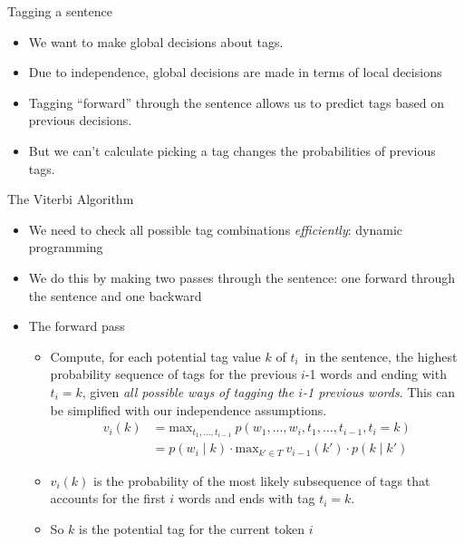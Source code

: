 \documentclass[11pt,letterpaper]{article}
\newcommand{\tcurr}{\ensuremath{t_i}}
\begin{document}
Tagging a sentence

\begin{itemize}
  \item We want to make global decisions about tags.
  \item Due to independence, global decisions are made in terms of local decisions
  \item Tagging ``forward'' through the sentence allows us to predict tags based on previous decisions.
  \item But we can't calculate picking a tag changes the probabilities of previous tags.
\end{itemize}

The Viterbi Algorithm

\begin{itemize}
  \item We need to check all possible tag combinations \textit{efficiently}: dynamic programming
  \item We do this by making two passes through the sentence: one forward through the sentence and one backward
  \item The forward pass
    \begin{itemize}
      \item Compute, for each potential tag value $k$ of \tcurr\ in the sentence, the highest probability sequence of tags for the previous $i$-1 words and ending with $t_i=k$, given \textit{all possible ways of tagging the $i$-1 previous words}.  This can be simplified with our independence assumptions.
        \begin{align*}
          v_i(k) &= \text{max}_{t_1, ..., t_{i-1}}~p(w_1, ..., w_i, t_1, ..., t_{i-1}, t_i=k) \\
                 &= p(w_i \mid k) \cdot \text{max}_{k' \in T}~v_{i-1}(k') \cdot p(k \mid k')
        \end{align*}
      \item $v_i(k)$ is the probability of the most likely subsequence of tags that accounts for the first $i$ words and ends with tag $t_i = k$.
      \item So $k$ is the potential tag for the current token $i$

\end{itemize}
\end{itemize}
\end{document}
